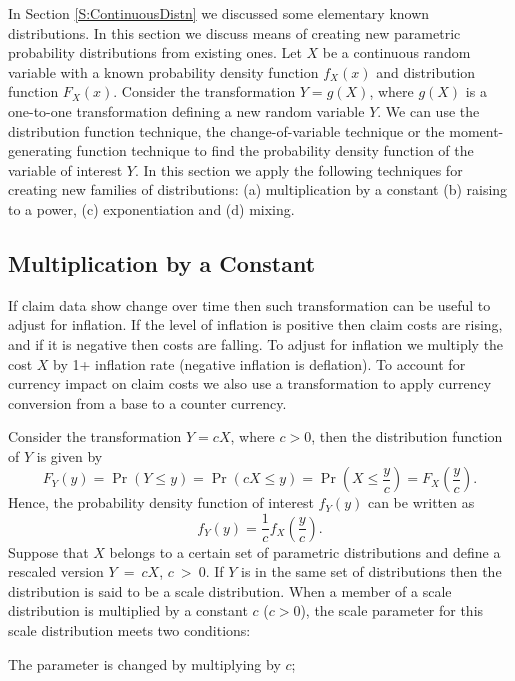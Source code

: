 \documentclass[]{book}
\theoremstyle{definition}
\theoremstyle{definition}
\theoremstyle{definition}
\theoremstyle{remark}
\begin{document}
In Section \ref{S:ContinuousDistn} we discussed some elementary known
distributions. In this section we discuss means of creating new
parametric probability distributions from existing ones. Let \(X\) be a
continuous random variable with a known probability density function
\(f_{X}(x)\) and distribution function \(F_{X}(x)\). Consider the
transformation \(Y = g\left( X \right)\), where \(g(X)\) is a one-to-one
transformation defining a new random variable \(Y\). We can use the
distribution function technique, the change-of-variable technique or the
moment-generating function technique to find the probability density
function of the variable of interest \(Y\). In this section we apply the
following techniques for creating new families of distributions: (a)
multiplication by a constant (b) raising to a power, (c) exponentiation
and (d) mixing.

\subsection{Multiplication by a
Constant}\label{multiplication-by-a-constant}

If claim data show change over time then such transformation can be
useful to adjust for inflation. If the level of inflation is positive
then claim costs are rising, and if it is negative then costs are
falling. To adjust for inflation we multiply the cost \(X\) by 1+
inflation rate (negative inflation is deflation). To account for
currency impact on claim costs we also use a transformation to apply
currency conversion from a base to a counter currency.

Consider the transformation \(Y = cX\), where \(c > 0\), then the
distribution function of \(Y\) is given by
\[F_{Y}\left( y \right) = \Pr\left( Y \leq y \right) = \Pr\left( cX \leq y \right) = \Pr\left( X \leq \frac{y}{c} \right) = F_{X}\left( \frac{y}{c} \right).\]
Hence, the probability density function of interest \(f_{Y}(y)\) can be
written as
\[f_{Y}\left( y \right) = \frac{1}{c}f_{X}\left( \frac{y}{c} \right).\]
Suppose that \(X\) belongs to a certain set of parametric distributions
and define a rescaled version \(Y\  = \ cX\), \(c\  > \ 0\). If \(Y\) is
in the same set of distributions then the distribution is said to be a
scale distribution. When a member of a scale distribution is multiplied
by a constant \(c\) (\(c > 0\)), the scale parameter for this scale
distribution meets two conditions:

The parameter is changed by multiplying by \(c\);
\end{document}
